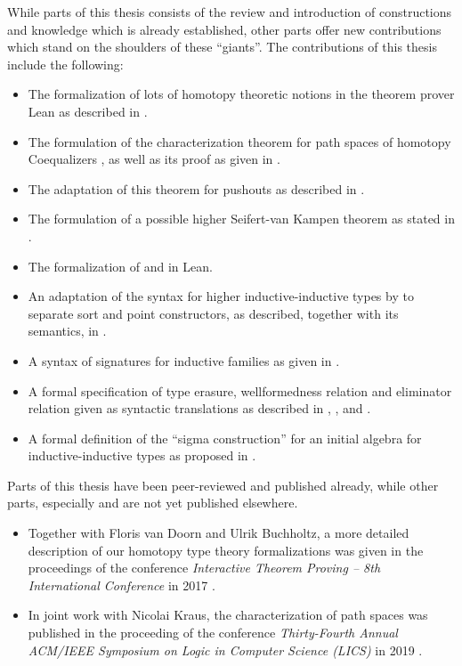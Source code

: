 While parts of this thesis consists of the review and introduction of constructions
and knowledge which is already established,
other parts offer new contributions which stand on the shoulders of these ``giants''.
The contributions of this thesis include the following:
\begin{itemize}
\item The formalization of lots of homotopy theoretic notions in the theorem prover
Lean as described in .
\item The formulation of the characterization theorem for path spaces
of homotopy Coequalizers , as well as its proof
as given in .
\item The adaptation of this theorem for pushouts as described in .
\item The formulation of a possible higher Seifert-van Kampen theorem
as stated in .
\item The formalization of  and 
in Lean.
\item An adaptation of the syntax for higher inductive-inductive types by
\citet{ambrussyntax} to separate sort and point constructors, as described, together with
its semantics, in .
\item A syntax of signatures for inductive families as given in .
\item A formal specification of type erasure, wellformedness relation and eliminator
relation given as syntactic translations as described in ,
, and .
\item A formal definition of the ``sigma construction'' for an initial algebra
for inductive-inductive types as proposed in .
\end{itemize}

Parts of this thesis have been peer-reviewed and published already, while
other parts, especially  and  are not yet published
elsewhere.
\begin{itemize}
\item Together with Floris van Doorn and Ulrik Buchholtz, a more
detailed description of our homotopy type theory formalizations was given
in the proceedings of the conference \emph{Interactive Theorem Proving -- 8th International Conference}
in 2017 \citep{leanhott}.
\item In joint work with Nicolai Kraus, the characterization of path spaces
was published in the proceeding of the conference
\emph{Thirty-Fourth Annual ACM/IEEE Symposium on
Logic in Computer Science (LICS)} in 2019 \citep{paths}.
\end{itemize}

